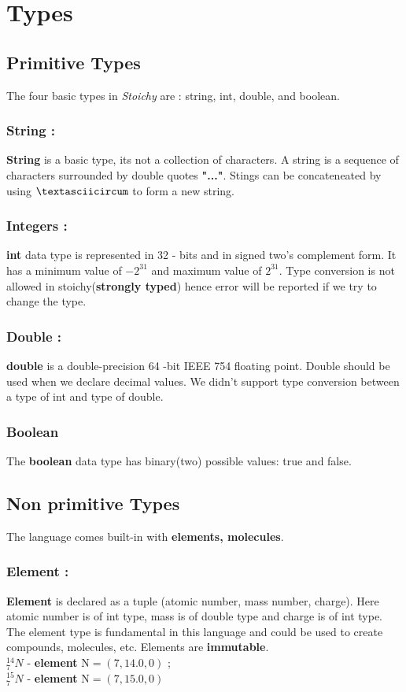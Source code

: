 \documentclass[english,a4paper,12pt]{report}
\begin{document}
\section{Types}
\subsection{Primitive Types} The four basic types in \textit{Stoichy} are :  string, int, double, and boolean.

\subsubsection{String :}  \textbf{String} is a basic type, its not a collection of characters. A string is a sequence of characters surrounded by double quotes \textbf{"..."}. Stings can be concateneated by using $\textasciicircum$  to form a new string.

\subsubsection{Integers :} \textbf{int} data type is represented in 32 - bits and in signed two's complement form. It has a minimum value of $-2^{31}$ and maximum value of $2^{31}$. Type conversion is not allowed in stoichy(\textbf{strongly typed}) hence error will be reported if we try to change the type.

\subsubsection{Double :} \textbf{double} is a double-precision 64 -bit IEEE 754 floating point. Double should be used when we declare decimal values. We didn't support type conversion between a type of int and type of double.

\subsubsection{Boolean} The \textbf{boolean} data type has binary(two) possible values: true and false.
\newpage
\subsection{Non primitive Types} The language comes built-in with \textbf{elements, molecules}.

\subsubsection{Element :}
 \textbf{Element} is declared as a tuple (atomic number, mass number, charge). Here atomic number is of int type, mass is of double type and charge is of int type. The element type is fundamental in this language and could be used to create compounds, molecules, etc. Elements are \textbf{immutable}.\\
${ }_{7}^{14} N$ - \textbf{element} $\mathrm{N}=(7,14.0,0)$ ;\\
${ }_{7}^{15} N$ - \textbf{element} $\mathrm{N}=(7,15.0,0)$
\end{document}
